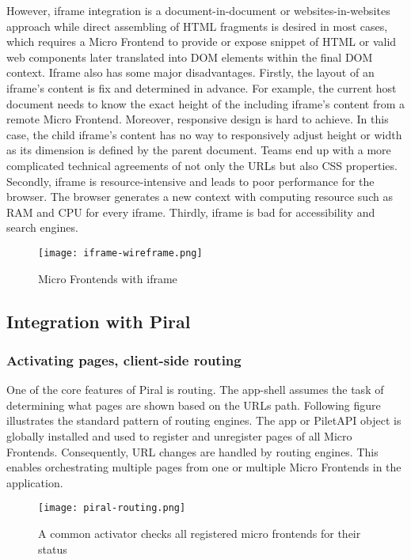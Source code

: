 \documentclass[a4paper]{book}
\begin{document}
However, iframe integration is a document-in-document or websites-in-websites approach while direct assembling of HTML fragments is desired in most cases, which requires a Micro Frontend to provide or expose snippet of HTML or valid web components later translated into DOM elements within the final DOM context. Iframe also has some major        disadvantages. Firstly, the layout of an iframe’s content is fix and determined in advance. For example, the current host document needs to know the exact height of the including iframe’s content from a remote Micro Frontend. Moreover, responsive design is hard to achieve. In this case, the child iframe’s content has no way to responsively adjust height or width as its dimension is defined by the parent document. Teams end up with a more complicated technical agreements of not only the URLs but also CSS properties. Secondly, iframe is resource-intensive and leads to poor performance for the browser. The browser generates a new context with computing resource such as RAM and CPU for every iframe. Thirdly, iframe is bad for accessibility and search engines.

\begin{figure}[h!]
  \centering
  \captionsetup{justification=centering}
  \texttt{[image: iframe-wireframe.png]}
  \caption{Micro Frontends with iframe \cite{Luc21}}
  \label{fig:iframe}
\end{figure}

\subsection{Integration with Piral} \label{Integration with Pira}

\subsubsection{Activating pages, client-side routing}
One of the core features of Piral is routing. The app-shell assumes the task of determining what pages are shown based on the URLs path. Following figure illustrates the standard pattern of routing engines. The app or PiletAPI object is globally installed and used to register and unregister pages of all Micro Frontends. Consequently, URL changes are handled by routing engines. This enables orchestrating multiple pages from one or multiple Micro Frontends in the application.
\begin{figure}[h!]
  \centering
  \captionsetup{justification=centering}
  \texttt{[image: piral-routing.png]}
  \caption{A common activator checks all registered micro frontends for their status \cite{Rap20}}
  \label{fig:piral-routing}
\end{figure}
\end{document}

